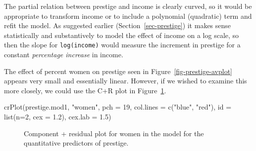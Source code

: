 \documentclass[
  letterpaper,
  10pt,
  krantz2]{krantz}
\makeatletter
\newenvironment{Shaded}{\begin{snugshade}}{\end{snugshade}}
\newcommand{\AttributeTok}[1]{\textcolor[rgb]{0.40,0.45,0.13}{#1}}
\newcommand{\DecValTok}[1]{\textcolor[rgb]{0.68,0.00,0.00}{#1}}
\newcommand{\FloatTok}[1]{\textcolor[rgb]{0.68,0.00,0.00}{#1}}
\newcommand{\FunctionTok}[1]{\textcolor[rgb]{0.28,0.35,0.67}{#1}}
\newcommand{\NormalTok}[1]{\textcolor[rgb]{0.00,0.23,0.31}{#1}}
\newcommand{\StringTok}[1]{\textcolor[rgb]{0.13,0.47,0.30}{#1}}
\newenvironment{kframe}{%
  \medskip{}
  \setlength{\fboxsep}{.8em}
  \def\at@end@of@kframe{}%
  \ifinner\ifhmode%
  \def\at@end@of@kframe{\end{minipage}}%
  \begin{minipage}{\columnwidth}%
  \fi\fi%
  \def\FrameCommand##1{\hskip\@totalleftmargin \hskip-\fboxsep
  \colorbox{shadecolor}{##1}\hskip-\fboxsep
      \hskip-\linewidth \hskip-\@totalleftmargin \hskip\columnwidth}%
  \MakeFramed {\advance\hsize-\width
    \@totalleftmargin\z@ \linewidth\hsize
    \@setminipage}}%
{\par\unskip\endMakeFramed%
  \at@end@of@kframe}
\renewenvironment{Shaded}{\begin{kframe}}{\end{kframe}}
\makeatother
\begin{document}
The partial relation between prestige and income is clearly curved, so
it would be appropriate to transform income or to include a polynomial
(quadratic) term and refit the model. As suggested earlier
(Section~\ref{sec-prestige}) it makes sense statistically and
substantively to model the effect of income on a log scale, so then the
slope for \texttt{log(income)} would measure the increment in prestige
for a constant \emph{percentage increase} in income.

The effect of percent women on prestige seen in
Figure~\ref{fig-prestige-avplot} appears very small and essentially
linear. However, if we wished to examine this more closely, we could use
the C+R plot in Figure~\ref{fig-prestige-crplot-women}.

\begin{Shaded}
\begin{Highlighting}[]
\FunctionTok{crPlot}\NormalTok{(prestige.mod1, }\StringTok{"women"}\NormalTok{,}
       \AttributeTok{pch =} \DecValTok{19}\NormalTok{,}
       \AttributeTok{col.lines =} \FunctionTok{c}\NormalTok{(}\StringTok{"blue"}\NormalTok{, }\StringTok{"red"}\NormalTok{),}
       \AttributeTok{id =} \FunctionTok{list}\NormalTok{(}\AttributeTok{n=}\DecValTok{2}\NormalTok{, }\AttributeTok{cex =} \FloatTok{1.2}\NormalTok{),}
       \AttributeTok{cex.lab =} \FloatTok{1.5}\NormalTok{)}
\end{Highlighting}
\end{Shaded}

\begin{figure}[H]


\caption{\label{fig-prestige-crplot-women}Component + residual plot for
women in the model for the quantitative predictors of prestige.}

\end{figure}%
\end{document}
